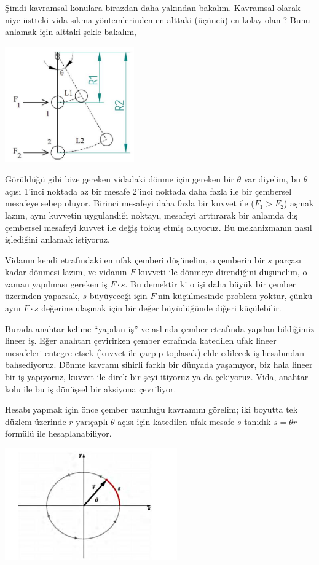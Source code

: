 \documentclass[12pt,fleqn]{article}\usepackage{../../common}
\begin{document}
Şimdi kavramsal konulara birazdan daha yakından bakalım. Kavramsal olarak niye
üstteki vida sıkma yöntemlerinden en alttaki (üçüncü) en kolay olanı? Bunu
anlamak için alttaki şekle bakalım,

\includegraphics[width=15em]{phy_005_basics_02_13.jpg}

Görüldüğü gibi bize gereken vidadaki dönme için gereken bir $\theta$ var
diyelim, bu $\theta$ açısı 1'inci noktada az bir mesafe 2'inci noktada daha
fazla ile bir çembersel mesafeye sebep oluyor. Birinci mesafeyi daha fazla bir
kuvvet ile ($F_1 > F_2$) aşmak lazım, aynı kuvvetin uygulandığı noktayı,
mesafeyi arttırarak bir anlamda dış çembersel mesafeyi kuvvet ile değiş tokuş
etmiş oluyoruz. Bu mekanizmanın nasıl işlediğini anlamak istiyoruz.

Vidanın kendi etrafındaki en ufak çemberi düşünelim, o çemberin bir $s$ parçası
kadar dönmesi lazım, ve vidanın $F$ kuvveti ile dönmeye direndiğini düşünelim, o
zaman yapılması gereken iş $F \cdot s$. Bu demektir ki o işi daha büyük bir
çember üzerinden yaparsak, $s$ büyüyeceği için $F$'nin küçülmesinde problem
yoktur, çünkü aynı $F \cdot s$ değerine ulaşmak için bir değer büyüdüğünde
diğeri küçülebilir.

Burada anahtar kelime ``yapılan iş'' ve aslında çember etrafında yapılan
bildiğimiz lineer iş. Eğer anahtarı çevirirken çember etrafında katedilen ufak
lineer mesafeleri entegre etsek (kuvvet ile çarpıp toplasak) elde edilecek iş
hesabından bahsediyoruz. Dönme kavramı sihirli farklı bir dünyada yaşamıyor, biz
hala lineer bir iş yapıyoruz, kuvvet ile direk bir şeyi itiyoruz ya da
çekiyoruz.  Vida, anahtar kolu ile bu iş dönüşsel bir aksiyona çevriliyor.

Hesabı yapmak için önce çember uzunluğu kavramını görelim; iki boyutta tek
düzlem üzerinde $r$ yarıçaplı $\theta$ açısı için katedilen ufak mesafe $s$
tanıdık $s = \theta r$ formülü ile hesaplanabiliyor.

\includegraphics[width=20em]{phy_005_basics_02_06.jpg}
\end{document}
